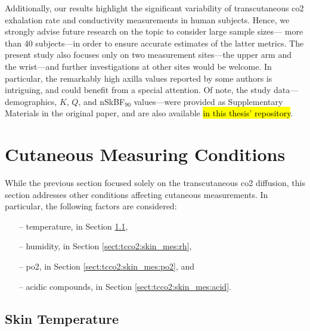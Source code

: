 Additionally, our results highlight the significant variability of transcutaneous \gls{co2} exhalation rate and conductivity measurements in human subjects. Hence, we strongly advise future research on the topic to consider large sample sizes---\ie{} more than 40 subjects---in order to ensure accurate estimates of the latter metrics. The present study also focuses only on two measurement sites---the upper arm and the wrist---and further investigations at other sites would be welcome. In particular, the remarkably high axilla values reported by some authors is intriguing, and could benefit from a special attention. Of note, the study data---demographics, $K$, $Q$, and nSkBF$_{90}$ values---were provided as Supplementary Materials in the original paper\cite{dervieux2023rate}, and are also available \hl{in this thesis' repository}.

\section{Cutaneous Measuring Conditions}\label{sect:tcco2:skin_conditions}

While the previous section focused solely on the transcutaneous \gls{co2} diffusion, this section addresses other conditions affecting cutaneous measurements. In particular, the following factors are considered:
\begin{multicols}{2}
	\begin{itemize}
		\item[--] temperature, in Section \ref{sect:tcco2:skin_mes:temp},
		\item[--] humidity, in Section \ref{sect:tcco2:skin_mes:rh},
		\item[--] \gls{po2}, in Section \ref{sect:tcco2:skin_mes:po2}, and
		\item[--] acidic compounds, in Section \ref{sect:tcco2:skin_mes:acid}.
	\end{itemize}
\end{multicols}

\subsection{Skin Temperature}\label{sect:tcco2:skin_mes:temp}

